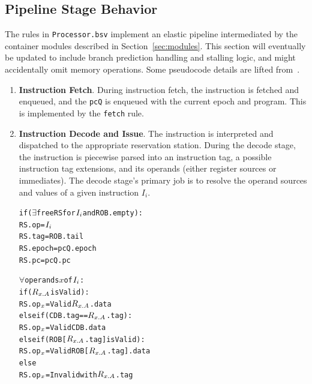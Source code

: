 \documentclass[12pt]{article}
\newcommand{\mtt}[1]{\(#1\)}
\begin{document}
\subsection{Pipeline Stage Behavior\label{sec:stages}}
The rules in \verb=Processor.bsv= implement an elastic pipeline intermediated
by the container modules described in Section~\ref{sec:modules}. This section
will eventually be updated to include branch prediction handling and stalling
logic, and might accidentally omit memory operations. Some pseudocode details
are lifted from~\cite{99KMP}.
\begin{enumerate}
    \item \textbf{Instruction Fetch}. During instruction fetch, the instruction is fetched and enqueued, and the
\verb=pcQ= is enqueued with the current epoch and program. This is implemented
by the \verb=fetch= rule. 
        
    \item \textbf{Instruction Decode and Issue}. The instruction is interpreted and dispatched to the appropriate reservation
station. During the decode stage, the instruction is piecewise parsed into an
instruction tag, a possible instruction tag extensions, and its operands
(either register sources or immediates). The decode stage's primary job is to
resolve the operand sources and values of a given instruction $I_i$.
       \begin{alltt}
           if (\mtt{\exists} free RS for \mtt{I\sb{i}} and ROB.empty):
               RS.op =  \mtt{I\sb{i}}
               RS.tag = ROB.tail
               RS.epoch = pcQ.epoch
               RS.pc = pcQ.pc
               
               \mtt{\forall} operands \mtt{x} of \mtt{I\sb{i}}:
                   if (\mtt{R\sb{x.A}} is Valid):
                       RS.op\mtt{\sb{x}} = Valid \mtt{R\sb{x.A}}.data
                   else if (CDB.tag == \mtt{R\sb{x.A}}.tag):
                       RS.op\mtt{\sb{x}} = Valid CDB.data
                   else if (ROB[\mtt{R\sb{x.A}}.tag] is Valid):
                       RS.op\mtt{\sb{x}} = Valid ROB[\mtt{R\sb{x.A}}.tag].data
                   else
                       RS.op\mtt{\sb{x}} = Invalid with \mtt{R\sb{x.A}}.tag
                       

\end{alltt}
\end{enumerate}
\end{document}
